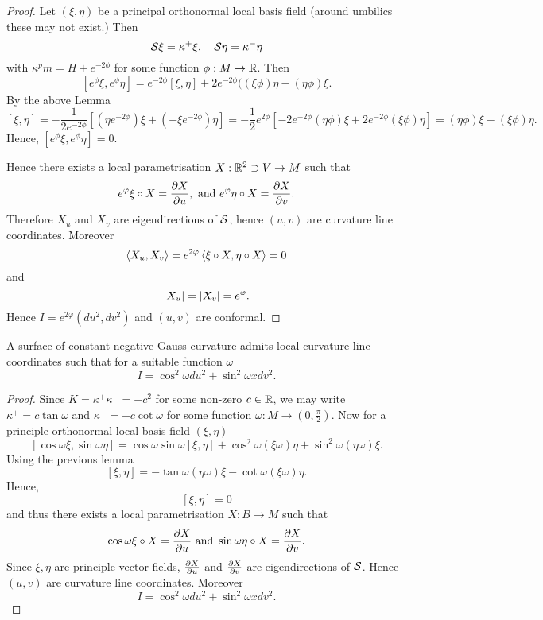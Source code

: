 \begin{proof}
	
	Let $ (\xi,\eta) $ be a principal orthonormal local basis field (around umbilics these  may not exist.) Then 
		\[ \mathcal S \xi = \kappa^+\xi, \quad \mathcal S \eta = \kappa^-\eta \]
		with $ \kappa^pm = H \pm e^{-2 \phi} $ for some function $ \phi: M \rightarrow \mathbb R $.
	Then 
		\[ [ e^\phi \xi, e^\phi \eta ] =  e^{-2\phi}[\xi,\eta] + 2e^{-2\phi}((\xi \phi)\eta - (\eta\phi)\xi. \]
	By the above Lemma
		\[ [\xi,\eta] = - \dfrac{1}{2e^{-2\phi}}\left[(\eta e^{-2\phi})\xi + (-\xi e^{-2\phi})\eta\right] = - \dfrac{1}{2} e^{2\phi}[ -2e^{-2\phi}(\eta \phi)\xi + 2e^{-2\phi}(\xi \phi) \eta ] = (\eta \phi)\xi - (\xi \phi)\eta. \]
	Hence, $ [ e^\phi \xi , e^\phi \eta ] = 0 $.	
	
	
	Hence there exists a local parametrisation $X: \mathbb R^2 \supset V \to M$ such that
	\[ e^\varphi \xi \circ X= \frac{\partial X}{\partial u}, \text{ and } e^\varphi \eta \circ X = \frac{\partial X}{\partial v}. \]
	Therefore $X_u$ and $X_v$ are eigendirections of $\mathcal S$, hence $(u,v)$ are curvature line coordinates. Moreover
	\[ \left \langle X_u, X_v \right\rangle = e^{2\varphi} \left \langle \xi \circ X , \eta \circ X \right\rangle = 0 \]
	and
	\[ \left| X_u\right| = \left| X_v\right| = e^\varphi. \]
	Hence $I= e^{2\varphi} (du^2,dv^2)$ and $(u,v)$ are conformal.
\end{proof}

\begin{corollary}
	A surface of constant negative Gauss curvature admits local curvature line coordinates such that for a suitable function $\omega$
	\[ I= \cos^2 \omega du^2 + \sin^2\omega xdv^2. \] 
\end{corollary}

\begin{proof}
	Since $K= \kappa^+\kappa^- = -c^2$ for some non-zero $c \in \mathbb R$, we may write $\kappa^+ = c \tan \omega$ and $\kappa^- = -c \cot \omega$ for some function $\omega: M \to \left( 0,\frac \pi 2 \right)$. Now for a principle orthonormal local basis field $(\xi,\eta)$
		\[ [\cos \omega \xi , \sin \omega\eta] = \cos\omega\sin\omega[\xi,\eta]	+ \cos^2 \omega(\xi\omega)\eta + \sin^2\omega(\eta\omega)\xi.  \] 
	Using the previous lemma
		\[ [\xi,\eta] = -\tan \omega(\eta\omega)\xi- \cot\omega(\xi\omega)\eta. \]
	Hence, 
		\[ [\xi,\eta]=0 \]
	and thus there exists a local parametrisation $X: B \to M$ such that
		\[ \cos\omega\xi\circ X = \frac{\partial X}{\partial u} \text{ and } \sin\omega\eta \circ X = \frac{\partial X}{\partial v}. \]
	Since $\xi,\eta$ are principle vector fields, $\frac{\partial X}{\partial u}$ and $\frac{\partial X}{\partial v}$ are eigendirections of $\mathcal S$. Hence $(u,v)$ are curvature line coordinates. Moreover
		\[ I= \cos^2 \omega du^2 + \sin^2\omega xdv^2. \] 
\end{proof}

